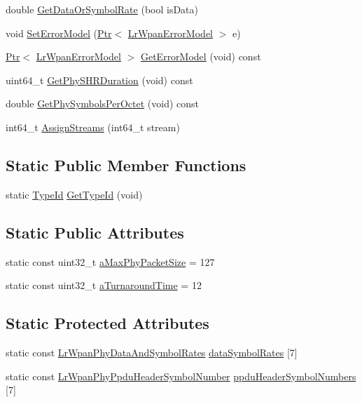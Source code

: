 \begin{DoxyCompactItemize}
double \hyperlink{classns3_1_1LrWpanPhy_a1bb730cd2cadcdd444a00c1198035b89}{Get\+Data\+Or\+Symbol\+Rate} (bool is\+Data)
\item 
void \hyperlink{classns3_1_1LrWpanPhy_aa427b690f6771f123732c375006c5058}{Set\+Error\+Model} (\hyperlink{classns3_1_1Ptr}{Ptr}$<$ \hyperlink{classns3_1_1LrWpanErrorModel}{Lr\+Wpan\+Error\+Model} $>$ e)
\item 
\hyperlink{classns3_1_1Ptr}{Ptr}$<$ \hyperlink{classns3_1_1LrWpanErrorModel}{Lr\+Wpan\+Error\+Model} $>$ \hyperlink{classns3_1_1LrWpanPhy_ab88a23e2906d21cd0fa0643c8605a337}{Get\+Error\+Model} (void) const 
\item 
uint64\+\_\+t \hyperlink{classns3_1_1LrWpanPhy_a2a6657d32de705411ccc26654d7d7e43}{Get\+Phy\+S\+H\+R\+Duration} (void) const 
\item 
double \hyperlink{classns3_1_1LrWpanPhy_af06487ea83c29daf11e23b908464a63d}{Get\+Phy\+Symbols\+Per\+Octet} (void) const 
\item 
int64\+\_\+t \hyperlink{classns3_1_1LrWpanPhy_a869f5ae34809909cd8f141dbe81d4394}{Assign\+Streams} (int64\+\_\+t stream)
\end{DoxyCompactItemize}
\subsection*{Static Public Member Functions}
\begin{DoxyCompactItemize}
\item 
static \hyperlink{classns3_1_1TypeId}{Type\+Id} \hyperlink{classns3_1_1LrWpanPhy_a0f49346313924575b61679c52e769c19}{Get\+Type\+Id} (void)
\end{DoxyCompactItemize}
\subsection*{Static Public Attributes}
\begin{DoxyCompactItemize}
\item 
static const uint32\+\_\+t \hyperlink{classns3_1_1LrWpanPhy_a0dac53931aac7c959546ca54db5e39bb}{a\+Max\+Phy\+Packet\+Size} = 127
\item 
static const uint32\+\_\+t \hyperlink{classns3_1_1LrWpanPhy_a8236b734a3ecb7d0c7528e693e80930d}{a\+Turnaround\+Time} = 12
\end{DoxyCompactItemize}
\subsection*{Static Protected Attributes}
\begin{DoxyCompactItemize}
\item 
static const \hyperlink{structns3_1_1LrWpanPhyDataAndSymbolRates}{Lr\+Wpan\+Phy\+Data\+And\+Symbol\+Rates} \hyperlink{classns3_1_1LrWpanPhy_a28fa5c94a795cfc6c086024110a33b9d}{data\+Symbol\+Rates} \mbox{[}7\mbox{]}
\item 
static const \hyperlink{structns3_1_1LrWpanPhyPpduHeaderSymbolNumber}{Lr\+Wpan\+Phy\+Ppdu\+Header\+Symbol\+Number} \hyperlink{classns3_1_1LrWpanPhy_add389321606b4a809e3f889ef7e97173}{ppdu\+Header\+Symbol\+Numbers} \mbox{[}7\mbox{]}
\end{DoxyCompactItemize}
